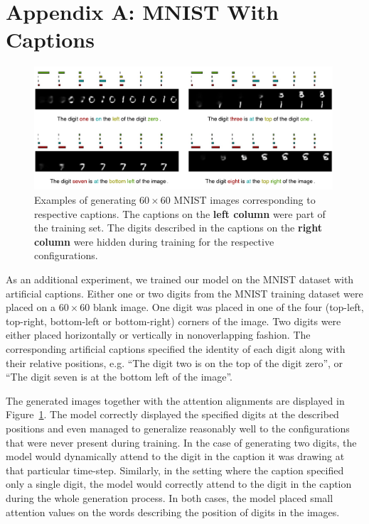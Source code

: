 
\section*{Appendix A: MNIST With Captions}

\begin{figure}[!t]
\captionsetup[subfigure]{labelformat=empty}
\begin{center}
\includegraphics[width=0.99\textwidth]{figures/new/mnist/test3.pdf}\quad
%
\end{center}
\caption{Examples of generating $60 \times 60$ MNIST images corresponding to respective captions. The captions on the \textbf{left column} were part of the training set. The digits described in the captions on the \textbf{right column} were hidden during training for the respective configurations.}
\label{fig:figmnist}
\vspace{-0.3cm}
\end{figure}

As an additional experiment, we trained our model on the MNIST dataset with artificial captions. Either one or two digits from the MNIST training dataset were placed on a $60 \times 60$ blank image. One digit was placed in one of the four (top-left, top-right, bottom-left or bottom-right) corners of the image. Two digits were either placed horizontally or vertically in nonoverlapping fashion. The corresponding artificial captions specified the 
identity of each digit along with their relative positions, e.g. ``The digit two is on the top  
of the digit zero'', or ``The digit seven is at the bottom left of the image''.  

The generated images together with the attention alignments are displayed in Figure~\ref{fig:figmnist}. The model correctly displayed the specified digits at the described positions and even managed to generalize 
reasonably well to the configurations that were never present during training.
In the case of generating two digits, the model would dynamically attend 
to the digit in the caption it was drawing at that particular time-step. 
Similarly, in the setting where the caption specified only a single digit, the model would correctly 
attend to the digit in the caption during the whole generation process. 
In both cases, the model placed small attention values on the words describing the position of digits in the images.

